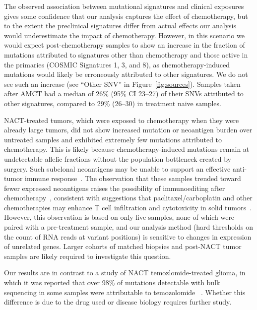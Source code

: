 The observed association between mutational signatures and clinical exposures gives some confidence that our analysis captures the effect of chemotherapy, but to the extent the preclinical signatures differ from actual effects our analysis would underestimate the impact of chemotherapy. However, in this scenario we would expect post-chemotherapy samples to show an increase in the fraction of mutations attributed to signatures other than chemotherapy and those active in the primaries (COSMIC Signatures 1, 3, and 8), as chemotherapy-induced mutations would likely be erroneously attributed to other signatures. We do not see such an increase (see ``Other SNV'' in Figure~\ref{fig:sources}). Samples taken after AMCT had a median of 26\% (95\% CI 23--27) of their SNVs attributed to other signatures, compared to 29\% (26--30) in treatment naive samples.

NACT-treated tumors, which were exposed to chemotherapy when they were already large tumors, did not show increased mutation or neoantigen burden over untreated samples and exhibited extremely few mutations attributed to chemotherapy. This is likely because chemotherapy-induced mutations remain at undetectable allelic fractions without the population bottleneck created by surgery. Such subclonal neoantigens may be unable to support an effective anti-tumor immune response~\cite{McGranahan_2016}. The observation that these samples trended toward fewer expressed neoantigens raises the possibility of immunoediting after chemotherapy~\cite{Dunn_2002}, consistent with suggestions that paclitaxel/carboplatin and other chemotherapies may enhance T cell infiltration and cytotoxicity in solid tumors~\cite{Demaria2001,Wu_2009,Pfannenstiel_2010,Hodge_2013}. However, this observation is based on only five samples, none of which were paired with a pre-treatment sample, and our analysis method (hard thresholds on the count of RNA reads at variant positions) is sensitive to changes in expression of unrelated genes. Larger cohorts of matched biopsies and post-NACT tumor samples are likely required to investigate this question.

Our results are in contrast to a study of NACT temozlomide-treated glioma, in which it was reported that over 98\% of mutations detectable with bulk sequencing in some samples were attributable to temozolomide ~\cite{Johnson_2013}. Whether this difference is due to the drug used or disease biology requires further study.


